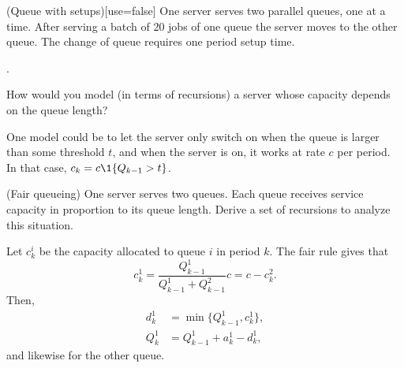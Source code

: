 \begin{question}(Queue with setups)[use=false]
  One server serves two parallel queues, one at a time. After serving
  a batch of 20 jobs of one queue the server moves to the other
  queue. The change of queue requires one period setup time.
  \begin{solution}
    \tbd.
  \end{solution}
\end{question}


\begin{question}
  How would you model (in terms of recursions) a server whose capacity depends on the queue length? 
  \begin{solution}
    One model could be to let the server only switch on when the queue
    is larger than some threshold $t$, and when the server is on, it
    works at rate $c$ per period. In that case,
    $c_k = c\1{Q_{k-1} > t}$.
  \end{solution}
\end{question}

\begin{question}(Fair queueing) One server serves two queues. Each
  queue receives service capacity in proportion to its queue length. Derive a set of recursions to analyze this situation.
  \begin{solution}
    Let $c_k^i$ be the capacity allocated to queue $i$ in period $k$. The fair rule gives that 
    \begin{equation*}
      c_k^1 = \frac{Q_{k-1}^1}{Q_{k-1}^1 + Q_{k-1}^2} c = c - c_k^2. 
    \end{equation*}
Then, 
\begin{equation*}
  \begin{split}
      d_k^1 &= \min\{Q_{k-1}^1, c^1_k\}, \\
Q_k^1 &= Q_{k-1}^1+a_k^1  - d_k^1,
  \end{split}
\end{equation*}
and likewise for the other queue.
  \end{solution}
  \end{question}

